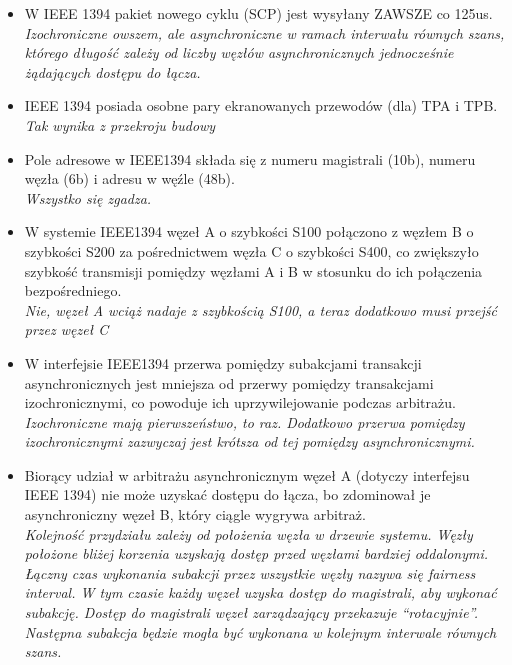 \documentclass[a4paper,twoside]{article}
\begin{document}
\begin{itemize}
	\item \textcolor{nie}{W IEEE 1394 pakiet nowego cyklu (SCP) jest wysyłany ZAWSZE co 125us.} \\
	{\small \emph{Izochroniczne owszem, ale asynchroniczne w ramach interwału równych szans, którego długość zależy od liczby węzłów asynchronicznych jednocześnie żądających dostępu do łącza.}}
	
	\item \textcolor{tak}{IEEE 1394 posiada osobne pary ekranowanych przewodów (dla) TPA i TPB.} \\
	{\small \emph{Tak wynika z przekroju budowy}}
	
	\item \textcolor{tak}{Pole adresowe w IEEE1394 składa się z numeru magistrali (10b), numeru węzła (6b) i adresu w węźle (48b).} \\
	{\small \emph{Wszystko się zgadza.}}
	
	\item \textcolor{nie}{W systemie IEEE1394 węzeł A o szybkości S100 połączono z węzłem B o szybkości S200 za pośrednictwem węzła C o szybkości S400, co zwiększyło szybkość transmisji pomiędzy węzłami A i B w stosunku do ich połączenia bezpośredniego.} \\
	{\small \emph{Nie, węzeł A wciąż nadaje z szybkością S100, a teraz dodatkowo musi przejść przez węzeł C}}
	
	\item \textcolor{nie}{W interfejsie IEEE1394 przerwa pomiędzy subakcjami transakcji asynchronicznych jest mniejsza od przerwy pomiędzy transakcjami izochronicznymi, co powoduje ich uprzywilejowanie podczas arbitrażu.} \\
	{\small \emph{Izochroniczne mają pierwszeństwo, to raz. Dodatkowo przerwa pomiędzy izochronicznymi zazwyczaj jest krótsza od tej pomiędzy asynchronicznymi.}}
	
	\item \textcolor{nie}{Biorący udział w arbitrażu asynchronicznym węzeł A (dotyczy interfejsu IEEE 1394) nie może uzyskać dostępu do łącza, bo zdominował je asynchroniczny węzeł B, który ciągle wygrywa arbitraż.} \\
	{\small \emph{Kolejność przydziału zależy od położenia węzła w drzewie systemu. Węzły położone bliżej korzenia uzyskają dostęp przed węzłami bardziej oddalonymi. Łączny czas wykonania subakcji przez wszystkie węzły nazywa się fairness interval. W tym czasie każdy węzeł uzyska dostęp do magistrali, aby wykonać subakcję. Dostęp do magistrali węzeł zarządzający przekazuje “rotacyjnie”. Następna subakcja będzie mogła być wykonana w kolejnym interwale równych szans.}} \\
	

\end{itemize}
\end{document}
